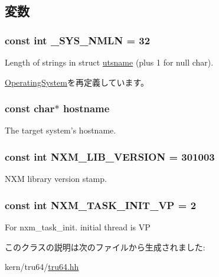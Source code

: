 \subsection{変数}
\hypertarget{classTru64_a1a19d4c9718c9a4ad5fa2e48271fccc9}{
\subsubsection[{\_\-SYS\_\-NMLN}]{\setlength{\rightskip}{0pt plus 5cm}const int {\bf \_\-SYS\_\-NMLN} = 32}}
\label{classTru64_a1a19d4c9718c9a4ad5fa2e48271fccc9}


Length of strings in struct \hyperlink{structTru64_1_1utsname}{utsname} (plus 1 for null char). 

\hyperlink{classOperatingSystem_a1a19d4c9718c9a4ad5fa2e48271fccc9}{OperatingSystem}を再定義しています。\hypertarget{classTru64_aad01339e89106fdf68f57ef118956fa9}{
\subsubsection[{hostname}]{\setlength{\rightskip}{0pt plus 5cm}const char$\ast$ {\bf hostname}}}
\label{classTru64_aad01339e89106fdf68f57ef118956fa9}


The target system's hostname. \hypertarget{classTru64_a42f5e6243e70c3d99afed9a0ab5ac3c1}{
\subsubsection[{NXM\_\-LIB\_\-VERSION}]{\setlength{\rightskip}{0pt plus 5cm}const int {\bf NXM\_\-LIB\_\-VERSION} = 301003}}
\label{classTru64_a42f5e6243e70c3d99afed9a0ab5ac3c1}


NXM library version stamp. \hypertarget{classTru64_a284276950ab5fbb4ed5432a4fe77c0b4}{
\subsubsection[{NXM\_\-TASK\_\-INIT\_\-VP}]{\setlength{\rightskip}{0pt plus 5cm}const int {\bf NXM\_\-TASK\_\-INIT\_\-VP} = 2}}
\label{classTru64_a284276950ab5fbb4ed5432a4fe77c0b4}


For nxm\_\-task\_\-init. initial thread is VP 

このクラスの説明は次のファイルから生成されました:\begin{DoxyCompactItemize}
\item 
kern/tru64/\hyperlink{kern_2tru64_2tru64_8hh}{tru64.hh}\end{DoxyCompactItemize}
